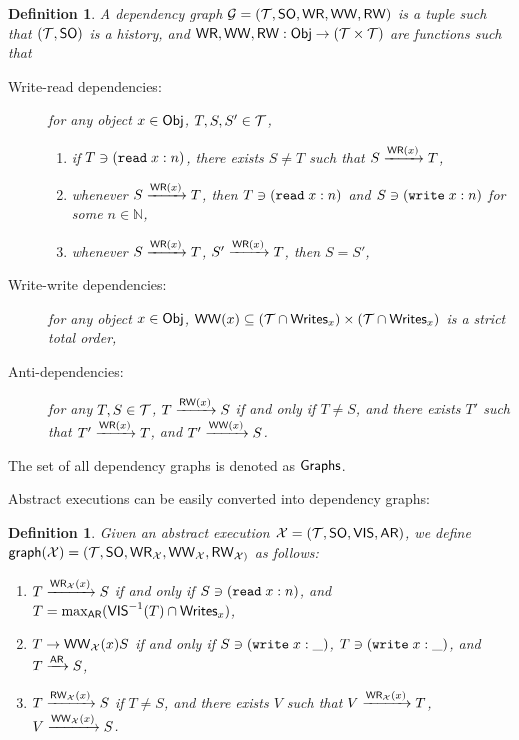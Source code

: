 \documentclass[a4paper,UKenglish]{article}%
\newtheorem{definition}[theorem]{Definition}
\theoremstyle{plain}
\begin{document}
\begin{definition}
A dependency graph $\mathcal{G} = (\mathcal{T}, {\sf{SO}}, {\mathsf{WR}}, {\mathsf{WW}}, {\mathsf{RW}})$ is a
tuple such that $(\mathcal{T}, {\sf{SO}})$ is a history, and ${\mathsf{WR}}, {\mathsf{WW}}, {\mathsf{RW}}: \mathsf{Obj} \rightarrow (\mathcal{T} \times \mathcal{T})$ 
are functions such that
\begin{description}
\item[Write-read dependencies: ] for any object $x \in \mathsf{Obj}$, $T,S,S' \in \mathcal{T}$, 
\begin{enumerate}
\item if $T \ni ({{\tt read}}\;x:n)$, there exists $S \neq T$ such that $S \xrightarrow{{\mathsf{WR}}(x)} T$, 
\item whenever $S \xrightarrow{{\mathsf{WR}}(x)} T$, then $T \ni ({{\tt read}}\;x:n)$ and $S \ni ({{\tt write}}\;x:n)$ 
for some $n \in \mathbb{N}$, 
\item whenever $S \xrightarrow{{\mathsf{WR}}(x)} T$, $S' \xrightarrow{{\mathsf{WR}}(x)} T$, then $S = S'$,
\end{enumerate}
\item[Write-write dependencies: ] for any object $x \in \mathsf{Obj}$, ${\mathsf{WW}}(x) \subseteq (\mathcal{T} \cap {\sf{Writes}}_x) \times (\mathcal{T} \cap {\sf{Writes}}_x)$ is a strict total 
order,
\item[Anti-dependencies: ] for any $T,S \in \mathcal{T}$, $T \xrightarrow{{\mathsf{RW}}(x)} S$ if and only if $T \neq S$, and there exists $T'$ 
such that $T' \xrightarrow{{\mathsf{WR}}(x)} T$, and $T' \xrightarrow{{\mathsf{WW}}(x)} S$.
\end{description}
\end{definition}
The set of all dependency graphs is denoted as $\mathsf{Graphs}$.

Abstract executions can be easily converted into dependency graphs: 
\begin{definition}
Given an abstract execution $\mathcal{X} = (\mathcal{T}, {\sf{SO}}, {\mathsf{VIS}}, {\sf{AR}})$, we define 
$\mathsf{graph}(\mathcal{X}) = (\mathcal{T}, {\sf{SO}}, {\mathsf{WR}}_{\mathcal{X}}, {\mathsf{WW}}_{\mathcal{X}}, {\mathsf{RW}}_{\mathcal{X})}$ as follows: 
\begin{enumerate} 
\item $T \xrightarrow{{\mathsf{WR}}_{\mathcal{X}}(x)} S$ if and only if $S \ni ({{\tt read}}\;x: n)$, and 
$T = \max_{{\sf{AR}}}({\mathsf{VIS}}^{-1}(T) \cap {\sf{Writes}}_x)$, 
\item $T \rightarrow{{\mathsf{WW}}_{\mathcal{X}}(x)} S$ if and only if $S \ni ({{\tt write}}\;x: \_)$, 
$T \ni ({{\tt write}}\;x: \_)$, and $T \xrightarrow{{\sf{AR}}} S$, 
\item $T \xrightarrow{{\mathsf{RW}}_{\mathcal{X}}(x)} S$ if $T \neq S$, and there exists 
$V$ such that $V \xrightarrow{{\mathsf{WR}}_{\mathcal{X}}(x)} T$, $V \xrightarrow{{\mathsf{WW}}_{\mathcal{X}}(x)} S$.
\end{enumerate}
\end{definition}
\end{document}
